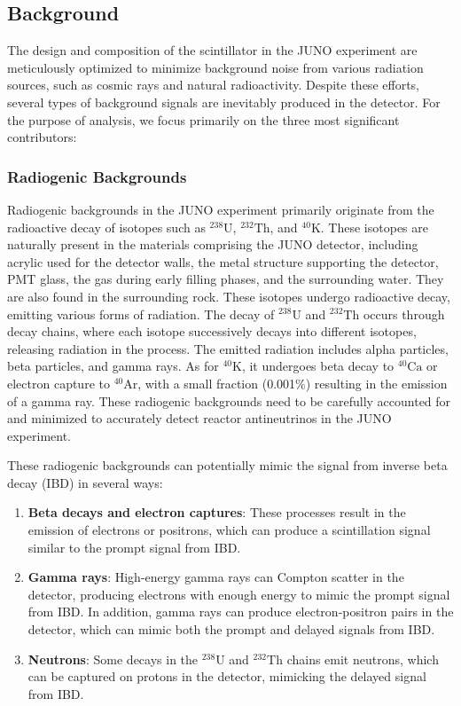 \subsection{Background}
The design and composition of the scintillator in the JUNO experiment are meticulously optimized to minimize background noise from various radiation sources, such as cosmic rays and natural radioactivity. Despite these efforts, several types of background signals are inevitably produced in the detector. For the purpose of analysis, we focus primarily on the three most significant contributors:


\subsubsection*{Radiogenic Backgrounds}


Radiogenic backgrounds in the JUNO experiment primarily originate from the radioactive decay of isotopes such as $^{238}\mathrm{U}$, $^{232}\mathrm{Th}$, and $^{40}\mathrm{K}$. These isotopes are naturally present in the materials comprising the JUNO detector, including acrylic used for the detector walls, the metal structure supporting the detector, PMT glass, the gas during early filling phases, and the surrounding water. They are also found in the surrounding rock. These isotopes undergo radioactive decay, emitting various forms of radiation. The decay of $^{238}\mathrm{U}$ and $^{232}\mathrm{Th}$ occurs through decay chains, where each isotope successively decays into different isotopes, releasing radiation in the process. The emitted radiation includes alpha particles, beta particles, and gamma rays. As for $^{40}\mathrm{K}$, it undergoes beta decay to $^{40}\mathrm{Ca}$ or electron capture to $^{40}\mathrm{Ar}$, with a small fraction (0.001$\%$) resulting in the emission of a gamma ray. These radiogenic backgrounds need to be carefully accounted for and minimized to accurately detect reactor antineutrinos in the JUNO experiment.


These radiogenic backgrounds can potentially mimic the signal from inverse beta decay (IBD) in several ways:

\begin{enumerate}
	\item \textbf{Beta decays and electron captures}: These processes result in the emission of electrons or positrons, which can produce a scintillation signal similar to the prompt signal from IBD.

	\item \textbf{Gamma rays}: High-energy gamma rays can Compton scatter in the detector, producing electrons with enough energy to mimic the prompt signal from IBD. In addition, gamma rays can produce electron-positron pairs in the detector, which can mimic both the prompt and delayed signals from IBD.
	
	\item \textbf{Neutrons}: Some decays in the $^{238}\mathrm{U}$ and $^{232}\mathrm{Th}$ chains emit neutrons, which can be captured on protons in the detector, mimicking the delayed signal from IBD.

\end{enumerate}

